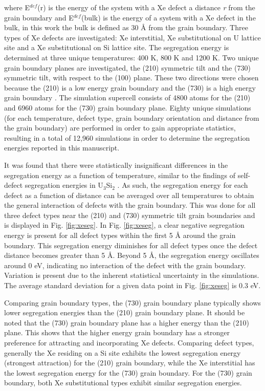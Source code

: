 \documentclass[review]{elsarticle}
\begin{document}
where E$^{def}$(r) is the energy of the system with a Xe defect a distance \textit{r} from the grain boundary and E$^{def}$(bulk) is the energy of a system with a Xe defect in the bulk, in this work the bulk is defined as 30 {\AA} from the grain boundary. Three types of Xe defects are investigated: Xe interstitial, Xe substitutional on U lattice site and a Xe substitutional on Si lattice site. The segregation energy is determined at three unique temperatures: 400 K, 800 K and 1200 K. Two unique grain boundary planes are investigated, the (210) symmetric tilt and the (730) symmetric tilt, with respect to the (100) plane. These two directions were chosen because the (210) is a low energy grain boundary and the (730) is a high energy grain boundary \cite{beeler_usi_gb}. The simulation supercell consists of 4800 atoms for the (210) and 6960 atoms for the (730) grain boundary plane. Eighty unique simulations (for each temperature, defect type, grain boundary orientation and distance from the grain boundary) are performed in order to gain appropriate statistics, resulting in a total of 12,960 simulations in order to determine the segregation energies reported in this manuscript.

It was found that there were statistically insignificant differences in the segregation energy as a function of temperature, similar to the findings of self-defect segregation energies in U$_3$Si$_2$ \cite{beeler_usi_gb}. As such, the segregation energy for each defect as a function of distance can be averaged over all temperatures to obtain the general interaction of defects with the grain boundary. This was done for all three defect types near the (210) and (730) symmetric tilt grain boundaries and is displayed in Fig. \ref{fig:xeseg}. In Fig. \ref{fig:xeseg}, a clear negative segregation energy is present for all defect types within the first 5 {\AA} around the grain boundary. This segregation energy diminishes for all defect types once the defect distance becomes greater than 5 {\AA}. Beyond 5 {\AA}, the segregation energy oscillates around 0 eV, indicating no interaction of the defect with the grain boundary. Variation is present due to the inherent statistical uncertainty in the simulations. The average standard deviation for a given data point in Fig. \ref{fig:xeseg} is 0.3 eV.

Comparing grain boundary types, the (730) grain boundary plane typically shows lower segregation energies than the (210) grain boundary plane. It should be noted that the (730) grain boundary plane has a higher energy than the (210) plane. This shows that the higher energy grain boundary has a stronger preference for attracting and incorporating Xe defects. Comparing defect types, generally the Xe residing on a Si site exhibits the lowest segregation energy (strongest attraction) for the (210) grain boundary, while the Xe interstitial has the lowest segregation energy for the (730) grain boundary. For the (730) grain boundary, both Xe substitutional types exhibit similar segregation energies. 
\end{document}
